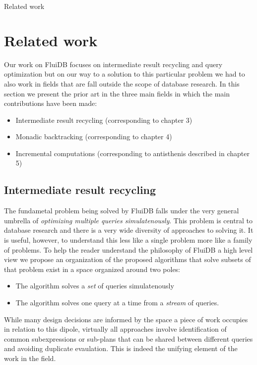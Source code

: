\begin{corrected}{Related work}
\section{Related work}

Our work on FluiDB focuses on intermediate result recycling and query
optimization but on our way to a solution to this particular problem
we had to also work in fields that are fall outside the scope of
database research. In this section we present the prior art in the
three main fields in which the main contributions have been made:

\begin{itemize}
\item Intermediate result recycling (corresponding to chapter 3)
\item Monadic backtracking (corresponding to chapter 4)
\item Incremental computations (corresponding to antisthenis described in
chapter 5)
\end{itemize}

\subsection{Intermediate result recycling}

The fundametal problem being solved by FluiDB falls under the very
general umbrella of \emph{optimizing multiple queries simulatenously}. This
problem is central to database research and there is a very wide
diversity of approaches to solving it. It is useful, however, to
understand this less like a single problem more like a family of
problems. To help the reader understand the philosophy of FluiDB a
high level view we propose an organization of the proposed algorithms
that solve subsets of that problem exist in a space organized around
two poles:

\begin{itemize}
\item The algorithm solves a \emph{set} of queries simulatenously
\item The algorithm solves one query at a time from a \emph{stream} of queries.
\end{itemize}

While many design decisions are informed by the space a piece of work
occupies in relation to this dipole, virtually all approaches involve
identification of common subexpressions or sub-plans that can be
shared between different queries and avoiding duplicate
evaulation. This is indeed the unifying element of the work in the
field.


\end{corrected}
